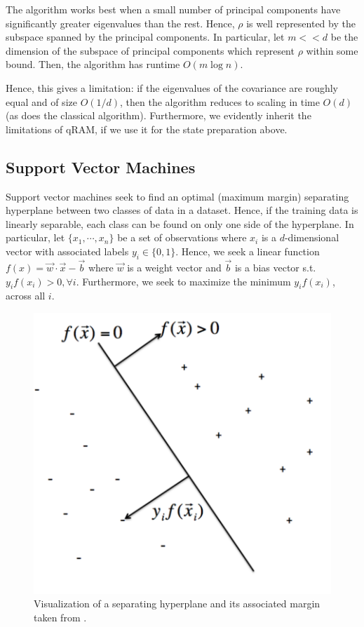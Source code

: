 \documentclass[main.tex]{subfiles}
\begin{document}
The algorithm works best when a small number of principal components have significantly greater eigenvalues than the rest. Hence, $\rho$ is well represented by the subspace spanned by the principal components. In particular, let $m << d$ be the dimension of the subspace of principal components which represent $\rho$ within some bound. Then, the algorithm has runtime $O(m \log n )$. 

Hence, this gives a limitation: if the eigenvalues of the covariance are roughly equal and of size $O(1/d)$, then the algorithm reduces to scaling in time $O(d)$ (as does the classical algorithm). Furthermore, we evidently inherit the limitations of qRAM, if we use it for the state preparation above.  

\subsection{Support Vector Machines}

Support vector machines seek to find an optimal (maximum margin) separating hyperplane between two classes of data in a dataset. Hence, if the training data is linearly separable, each class can be found on only one side of the hyperplane. In particular, let $\{ x_1 , \cdots , x_n \}$ be a set of observations where $x_i$ is a $d$-dimensional vector with associated labels $y_i \in \{ 0 , 1\}$. Hence, we seek a linear function $f(x) = \vec{w} \cdot \vec{x} - \vec{b}$ where $\vec{w}$ is a weight vector and $\vec{b}$ is a bias vector s.t. $y_if(x_i) > 0, \forall i$. Furthermore, we seek to maximize the minimum $y_i f(x_i)$, across all $i$. 

\begin{figure}[H]
\centering
\includegraphics[width=0.5\linewidth]{images/svm.png}	
\caption{Visualization of a separating hyperplane and its associated margin taken from \cite{rudin}.}
\end{figure}
\end{document}
